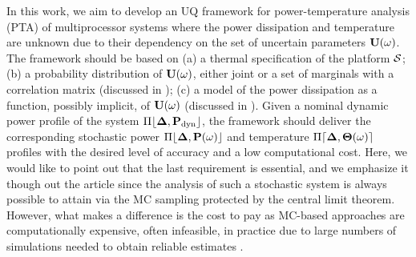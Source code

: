 In this work, we aim to develop an UQ framework for power-temperature analysis (PTA) of multiprocessor systems where the power dissipation and temperature are unknown due to their dependency on the set of uncertain parameters $\mathbf{U}(\omega)$. The framework should be based on (a) a thermal specification of the platform $\mathcal{S}$; (b) a probability distribution of $\mathbf{U}(\omega)$, either joint or a set of marginals with a correlation matrix (discussed in ); (c) a model of the power dissipation as a function, possibly implicit, of $\mathbf{U}(\omega)$ (discussed in ). Given a nominal dynamic power profile of the system $\profPdyn$, the framework should deliver the corresponding stochastic power $\profP{\o}$ and temperature $\profT{\o}$ profiles with the desired level of accuracy and a low computational cost. Here, we would like to point out that the last requirement is essential, and we emphasize it though out the article since the analysis of such a stochastic system is always possible to attain via the MC sampling protected by the central limit theorem. However, what makes a difference is the cost to pay as MC-based approaches are computationally expensive, often infeasible, in practice due to large numbers of simulations needed to obtain reliable estimates \cite{xiu2010, maitre2010, diaz-emparanza2002}.
